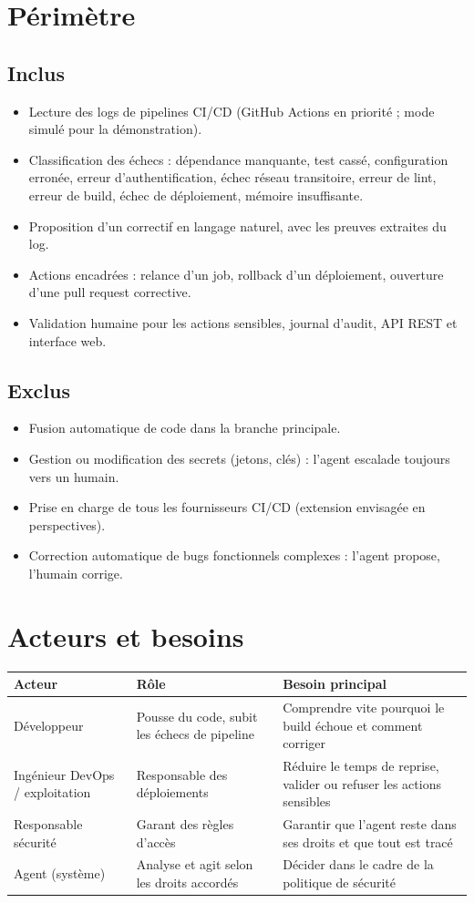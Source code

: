 \documentclass[11pt,a4paper]{article}
\begin{document}
\section{Périmètre}
\subsection{Inclus}
\begin{itemize}
\item Lecture des logs de pipelines CI/CD (GitHub Actions en priorité ; mode simulé pour la démonstration).
\item Classification des échecs : dépendance manquante, test cassé, configuration erronée, erreur
d'authentification, échec réseau transitoire, erreur de lint, erreur de build, échec de déploiement, mémoire insuffisante.
\item Proposition d'un correctif en langage naturel, avec les preuves extraites du log.
\item Actions encadrées : relance d'un job, rollback d'un déploiement, ouverture d'une pull request corrective.
\item Validation humaine pour les actions sensibles, journal d'audit, API REST et interface web.
\end{itemize}
\subsection{Exclus}
\begin{itemize}
\item Fusion automatique de code dans la branche principale.
\item Gestion ou modification des secrets (jetons, clés) : l'agent escalade toujours vers un humain.
\item Prise en charge de tous les fournisseurs CI/CD (extension envisagée en perspectives).
\item Correction automatique de bugs fonctionnels complexes : l'agent propose, l'humain corrige.
\end{itemize}

\section{Acteurs et besoins}
\begin{longtable}{p{3.2cm}p{5.6cm}p{5.7cm}}
\toprule
\textbf{Acteur} & \textbf{Rôle} & \textbf{Besoin principal} \\
\midrule\endhead
Développeur & Pousse du code, subit les échecs de pipeline & Comprendre vite pourquoi le build échoue et comment corriger \\
Ingénieur DevOps / exploitation & Responsable des déploiements & Réduire le temps de reprise, valider ou refuser les actions sensibles \\
Responsable sécurité & Garant des règles d'accès & Garantir que l'agent reste dans ses droits et que tout est tracé \\
Agent (système) & Analyse et agit selon les droits accordés & Décider dans le cadre de la politique de sécurité \\
\bottomrule
\end{longtable}
\end{document}
